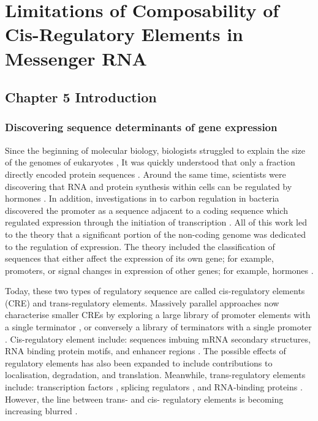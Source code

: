 \documentclass[../main.tex]{subfiles}
\begin{document}
\chapter{{Limitations} of Composability of Cis-Regulatory Elements in Messenger RNA}

\section{Chapter 5 Introduction}

\subsection{Discovering sequence determinants of gene expression}

Since the beginning of molecular biology, biologists struggled to explain the size of the genomes of eukaryotes \parencite{MIRSKY1951},
It was quickly understood that only a fraction directly encoded protein sequences \parencite{Thomas1971}. 
Around the same time, scientists were discovering that RNA and protein synthesis within cells can be regulated by hormones \parencite{Ui1963}.
In addition, investigations in to carbon regulation in bacteria discovered the promoter as a sequence adjacent to a coding sequence which regulated expression through the initiation of transcription \parencite{JACOB1964}.
All of this work led to the theory that a significant portion of the non-coding genome was dedicated to the regulation of expression. 
The theory included the classification of sequences that either affect the expression of its own gene; for example, promoters, or signal changes in expression of other genes; for example, hormones \parencite{Britten1969}. 

Today, these two types of regulatory sequence are called cis-regulatory elements (CRE) and trans-regulatory elements.
Massively parallel approaches now characterise smaller CREs by exploring a large library of promoter elements with a single terminator \parencite{Sharon2012}, or conversely a library of terminators with a single promoter \parencite{Shalem2015}.
Cis-regulatory element include: sequences imbuing mRNA secondary structures, RNA binding protein motifs, and enhancer regions \parencite{Li2015}. 
The possible effects of regulatory elements has also been expanded to include contributions to localisation, degradation, and translation.
Meanwhile, trans-regulatory elements include: transcription factors \parencite{Spitz2012}, splicing regulators \parencite{Will2011}, and RNA-binding proteins \parencite{Bleichert2010}.
However, the line between trans- and cis- regulatory elements is becoming increasing blurred \parencite{Savarese2006}.
\end{document}
